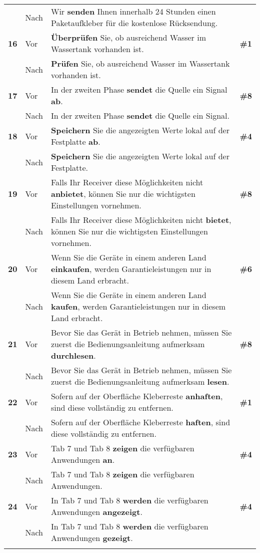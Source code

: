 \begin{longtable}{llp{}l}
& Nach & Wir \textbf{senden} Ihnen innerhalb 24 Stunden einen Paketaufkleber für die kostenlose Rücksendung. & \\
\tablevspace
{ \textbf{16}} & Vor & \textbf{Überprüfen} Sie, ob ausreichend Wasser im Wassertank vorhanden ist. & \textbf{\#1}\\
& Nach & \textbf{Prüfen} Sie, ob ausreichend Wasser im Wassertank vorhanden ist. & \\
\tablevspace
{ \textbf{17}} & Vor & In der zweiten Phase \textbf{sendet} die Quelle ein Signal \textbf{ab}. & \textbf{\#8}\\
& Nach & In der zweiten Phase \textbf{sendet} die Quelle ein Signal. & \\
\tablevspace
{ \textbf{18}} & Vor & \textbf{Speichern} Sie die angezeigten Werte lokal auf der Festplatte \textbf{ab}. & \textbf{\#4}\\
& Nach & \textbf{Speichern} Sie die angezeigten Werte lokal auf der Festplatte. & \\
\tablevspace
{ \textbf{19}} & Vor & Falls Ihr Receiver diese Möglichkeiten nicht \textbf{anbietet}, können Sie nur die wichtigsten Einstellungen vornehmen. & \textbf{\#8}\\
& Nach & Falls Ihr Receiver diese Möglichkeiten nicht \textbf{bietet}, können Sie nur die wichtigsten Einstellungen vornehmen. & \\
\tablevspace
{ \textbf{20}} & Vor & Wenn Sie die Geräte in einem anderen Land \textbf{einkaufen}, werden Garantieleistungen nur in diesem Land erbracht. & \textbf{\#6}\\
& Nach & Wenn Sie die Geräte in einem anderen Land \textbf{kaufen}, werden Garantieleistungen nur in diesem Land erbracht. & \\
\tablevspace
{ \textbf{21}} & Vor & Bevor Sie das Gerät in Betrieb nehmen, müssen Sie zuerst die Bedienungsanleitung aufmerksam \textbf{durchlesen}. & \textbf{\#8}\\
& Nach & Bevor Sie das Gerät in Betrieb nehmen, müssen Sie zuerst die Bedienungsanleitung aufmerksam \textbf{lesen}. & \\
\tablevspace
{ \textbf{22}} & Vor & Sofern auf der Oberfläche Kleberreste \textbf{anhaften}, sind diese vollständig zu entfernen. & \textbf{\#1}\\
& Nach & Sofern auf der Oberfläche Kleberreste \textbf{haften}, sind diese vollständig zu entfernen. & \\
\tablevspace
{ \textbf{23}} & Vor & Tab 7 und Tab 8 \textbf{zeigen} die verfügbaren Anwendungen \textbf{an}. & \textbf{\#4}\\
& Nach & Tab 7 und Tab 8 \textbf{zeigen} die verfügbaren Anwendungen. & \\
\tablevspace
{ \textbf{24}} & Vor & In Tab 7 und Tab 8 \textbf{werden} die verfügbaren Anwendungen \textbf{angezeigt}. & \textbf{\#4}\\
& Nach & In Tab 7 und Tab 8 \textbf{werden} die verfügbaren Anwendungen \textbf{gezeigt}. & \\
\lspbottomrule
\end{longtable}



